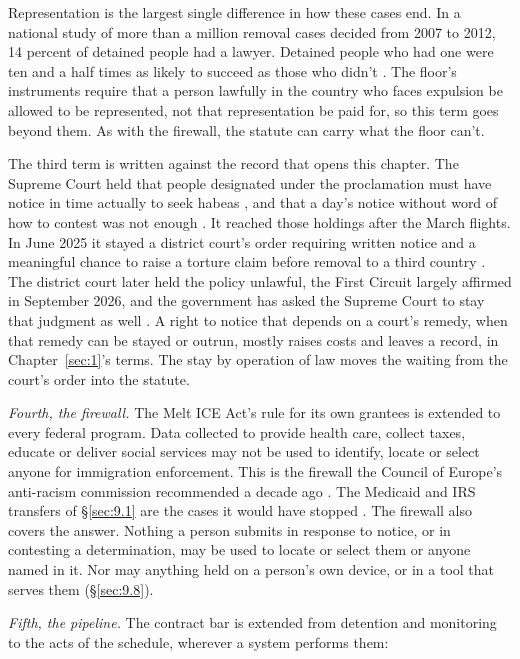 Representation is the largest single difference in how these cases end. In a national study of more than a million removal cases decided from 2007 to 2012, 14 percent of detained people had a lawyer. Detained people who had one were ten and a half times as likely to succeed as those who didn't \autocite{EaglyShafer2016Counsel}. The floor's instruments require that a person lawfully in the country who faces expulsion be allowed to be represented, not that representation be paid for, so this term goes beyond them. As with the firewall, the statute can carry what the floor can't.

The third term is written against the record that opens this chapter. The Supreme Court held that people designated under the proclamation must have notice in time actually to seek habeas \autocite{jgg2025}, and that a day's notice without word of how to contest was not enough \autocite{aarp2025}. It reached those holdings after the March flights. In June 2025 it stayed a district court's order requiring written notice and a meaningful chance to raise a torture claim before removal to a third country \autocite{dvd2025}. The district court later held the policy unlawful, the First Circuit largely affirmed in September 2026, and the government has asked the Supreme Court to stay that judgment as well \autocite{dvd2026application}. A right to notice that depends on a court's remedy, when that remedy can be stayed or outrun, mostly raises costs and leaves a record, in Chapter~\ref{sec:1}'s terms. The stay by operation of law moves the waiting from the court's order into the statute.

\emph{Fourth, the firewall.} The Melt ICE Act's rule for its own grantees is extended to every federal program. Data collected to provide health care, collect taxes, educate or deliver social services may not be used to identify, locate or select anyone for immigration enforcement. This is the firewall the Council of Europe's anti-racism commission recommended a decade ago \autocite{ecri2016gpr16}. The Medicaid and IRS transfers of \S\ref{sec:9.1} are the cases it would have stopped \autocite{JoffeBlock2026MedicaidPalantir,Shaw2026IRSICE}. The firewall also covers the answer. Nothing a person submits in response to notice, or in contesting a determination, may be used to locate or select them or anyone named in it. Nor may anything held on a person's own device, or in a tool that serves them (\S\ref{sec:9.8}).

\emph{Fifth, the pipeline.} The contract bar is extended from detention and monitoring to the acts of the schedule, wherever a system performs them:


